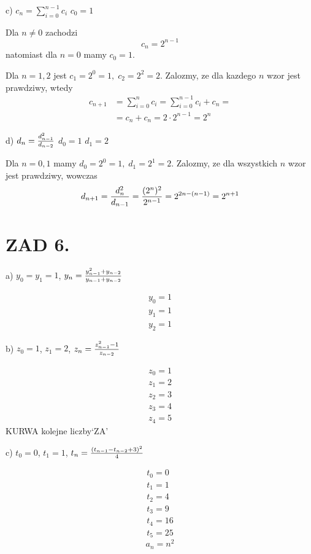 \documentclass{article}[13pt]
\begin{document}
    \medskip

    c) $c_n=\sum\limits_{i=0}^{n-1}c_i$ $c_0=1$

    Dla $n\neq 0$ zachodzi
    $$c_n=2^{n-1}$$
    natomiast dla $n=0$ mamy $c_0=1$.
    \medskip

    Dla $n=1,2$ jest $c_1=2^0=1,\;c_2=2^2=2$. Zalozmy, ze dla kazdego $n$ wzor jest prawdziwy, wtedy
    \begin{align*}
        c_{n+1}&=\sum\limits_{i=0}^nc_i=\sum\limits_{i=0}^{n-1}c_i+c_n=\\
        &=c_n+c_n=2\cdot 2^{n-1}=2^n
    \end{align*}

    \medskip

    d) $d_n={d_{n-1}^2\over d_{n-2}}$ $d_0=1$ $d_1=2$
    \medskip

    Dla $n=0,1$ mamy $d_0=2^0=1,\;d_1=2^1=2$. Zalozmy, ze dla wszystkich $n$ wzor jest prawdziwy, wowczas
    \begin{align*}
        d_{n+1}={d_n^2\over d_{n-1}}={(2^n)^2\over 2^{n-1}}=2^{2n-(n-1)}=2^{n+1}
    \end{align*}


    \section*{ZAD 6.}

    a) $y_0=y_1=1$, $y_n={y_{n-1}^2+y_{n-2}\over y_{n-1}+y_{n-2}}$
    \medskip

    \begin{align*}
        y_0=1\\
        y_1=1\\
        y_2=1
    \end{align*}

    b) $z_0=1$, $z_1=2$, $z_n={z_{n-1}^2-1\over z_{n-2}}$

    \begin{align*}
        z_0=1\\
        z_1=2\\
        z_2=3\\
        z_3=4\\
        z_4=5
    \end{align*}
    KURWA kolejne liczby`ZA'

    c) $t_0=0$, $t_1=1$, $t_n={(t_{n-1}-t_{n-2}+3)^2\over 4}$

    \begin{align*}
        t_0=0\\
        t_1=1\\
        t_2=4\\
        t_3=9\\
        t_4=16\\
        t_5=25
    \end{align*}
    $$a_n=n^2$$
\end{document}
